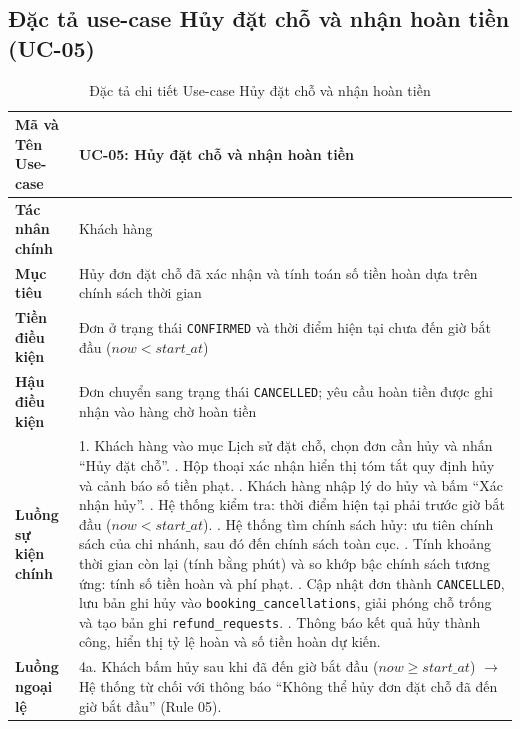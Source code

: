 \subsection{Đặc tả use-case Hủy đặt chỗ và nhận hoàn tiền (UC-05)}
\begin{table}[H]
\centering
\small
\renewcommand{\arraystretch}{1.2}
\begin{tabular}{|p{3.6cm}|p{10.4cm}|}
\hline
\textbf{Mã và Tên Use-case} & \textbf{UC-05: Hủy đặt chỗ và nhận hoàn tiền} \\ \hline
\textbf{Tác nhân chính} & Khách hàng \\ \hline
\textbf{Mục tiêu} & Hủy đơn đặt chỗ đã xác nhận và tính toán số tiền hoàn dựa trên chính sách thời gian \\ \hline
\textbf{Tiền điều kiện} & Đơn ở trạng thái \texttt{CONFIRMED} và thời điểm hiện tại chưa đến giờ bắt đầu ($now < start\_at$) \\ \hline
\textbf{Hậu điều kiện} & Đơn chuyển sang trạng thái \texttt{CANCELLED}; yêu cầu hoàn tiền được ghi nhận vào hàng chờ hoàn tiền \\ \hline
\textbf{Luồng sự kiện chính} & 
1. Khách hàng vào mục Lịch sử đặt chỗ, chọn đơn cần hủy và nhấn ``Hủy đặt chỗ''. \newline
2. Hộp thoại xác nhận hiển thị tóm tắt quy định hủy và cảnh báo số tiền phạt. \newline
3. Khách hàng nhập lý do hủy và bấm ``Xác nhận hủy''. \newline
4. Hệ thống kiểm tra: thời điểm hiện tại phải trước giờ bắt đầu ($now < start\_at$). \newline
5. Hệ thống tìm chính sách hủy: ưu tiên chính sách của chi nhánh, sau đó đến chính sách toàn cục. \newline
6. Tính khoảng thời gian còn lại (tính bằng phút) và so khớp bậc chính sách tương ứng: tính số tiền hoàn và phí phạt. \newline
7. Cập nhật đơn thành \texttt{CANCELLED}, lưu bản ghi hủy vào \texttt{booking\_cancellations}, giải phóng chỗ trống và tạo bản ghi \texttt{refund\_requests}. \newline
8. Thông báo kết quả hủy thành công, hiển thị tỷ lệ hoàn và số tiền hoàn dự kiến. \\ \hline
\textbf{Luồng ngoại lệ} & 
4a. Khách bấm hủy sau khi đã đến giờ bắt đầu ($now \ge start\_at$) $\rightarrow$ Hệ thống từ chối với thông báo ``Không thể hủy đơn đặt chỗ đã đến giờ bắt đầu'' (Rule 05). \\ \hline
\end{tabular}
\caption{Đặc tả chi tiết Use-case Hủy đặt chỗ và nhận hoàn tiền}
\label{tab:uc_spec_05}
\end{table}


